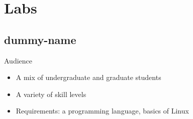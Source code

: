 \documentclass{beamer}
\begin{document}
	\section{Labs}
	\subsection{dummy-name}
	\begin{frame}{Audience}
	\begin{itemize}
		\item A mix of undergraduate and graduate students
		\item A variety of skill levels
		\item Requirements: a programming language, basics of Linux
	\end{itemize}
	\end{frame}
	
\end{document}
